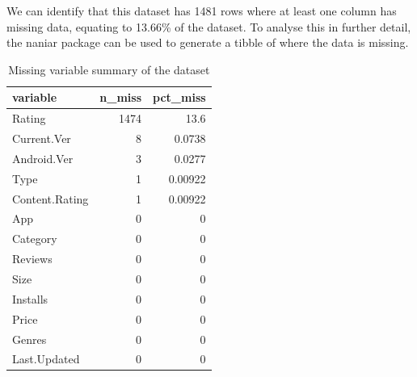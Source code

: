 \documentclass[12pt]{report}\usepackage[]{graphicx}\usepackage[]{xcolor}
\newenvironment{knitrout}{}{} %
\begin{document}
We can identify that this dataset has 1481 rows where at least one column has missing data, equating to 
13.66\% of the dataset. To analyse this in further detail,
the naniar package can be used to generate a tibble of where the data is missing.

\begin{knitrout}\footnotesize
{}\color{fgcolor}\begin{table}[H]
\centering
\caption{\label{tab:missingVars}Missing variable summary of the dataset}
\centering
\begin{tabular}[t]{l|r|r}
\hline
variable & n\_miss & pct\_miss\\
\hline
Rating & 1474 & 13.6\\
\hline
Current.Ver & 8 & 0.0738\\
\hline
Android.Ver & 3 & 0.0277\\
\hline
Type & 1 & 0.00922\\
\hline
Content.Rating & 1 & 0.00922\\
\hline
App & 0 & 0\\
\hline
Category & 0 & 0\\
\hline
Reviews & 0 & 0\\
\hline
Size & 0 & 0\\
\hline
Installs & 0 & 0\\
\hline
Price & 0 & 0\\
\hline
Genres & 0 & 0\\
\hline
Last.Updated & 0 & 0\\
\hline
\end{tabular}
\end{table}

\end{knitrout}

\end{document}
